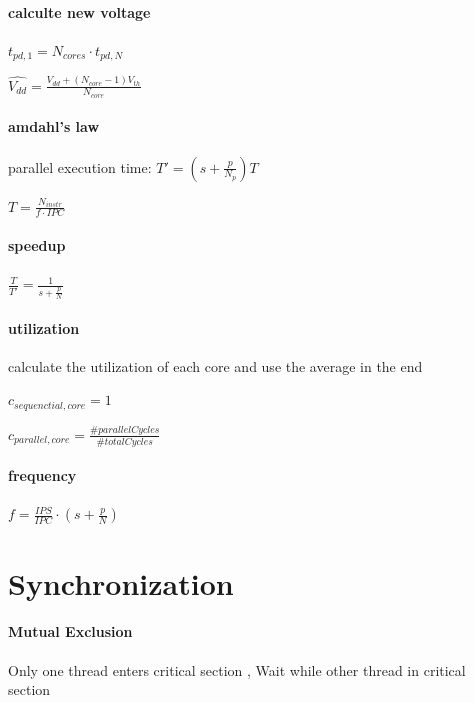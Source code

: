 \documentclass[fontsize=8pt]{scrartcl}
\newcommand{\coloreq}[1]{\colorbox{nordicRed}{\(\displaystyle #1\)}}
\begin{document}
\begin{multicols*}{4}
\paragraph{calculte new voltage} \coloreq{t_{pd,1} = N_{cores} \cdot t_{pd,N}}

\coloreq{\hat{V_{dd}} = \frac{V_{dd} + (N_{core} - 1) V_{th}}{N_{core}}}

\paragraph{amdahl's law} parallel execution time: \newline 
\indent\coloreq{T' = (s + \frac{p}{N_p}) T}

\coloreq{T = \frac{N_{instr}}{f \cdot IPC}}

\paragraph{speedup} \coloreq{\frac{T}{T'} = \frac{1}{s + \frac{p}{N}}}

\paragraph{utilization} calculate the utilization of each core and use the average in the end 

\coloreq{c_{sequenctial,core} = 1} 

\coloreq{c_{parallel,core} = \frac{\#parallelCycles}{\#totalCycles}}

\paragraph{frequency} \coloreq{f = \frac{IPS}{IPC} \cdot (s + \frac{p}{N})}




\section{Synchronization}


\paragraph{Mutual Exclusion}Only one thread enters critical section
, Wait while other thread in critical section


\end{multicols*}
\end{document}
